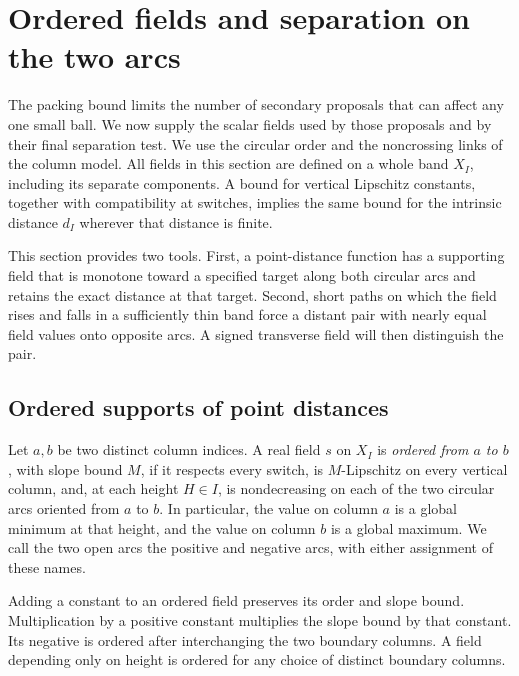 \section{Ordered fields and separation on the two arcs}
\label{ord:section}

The packing bound limits the number of secondary proposals that can
affect any one small ball. We now supply the scalar fields used by those
proposals and by
their final separation test. We use the circular order and the
noncrossing links of the column model.
All fields in this section are defined on a whole band $X_I$, including
its separate components. A bound for vertical Lipschitz constants,
together with compatibility at switches, implies the same bound for
the intrinsic distance $d_I$ wherever that distance is finite.

This section provides two tools.  First, a point-distance function has a
supporting field that is monotone toward a specified target along both
circular arcs and retains the exact distance at that target.  Second,
short paths on which the field rises and falls in a sufficiently thin band
force a distant pair with nearly equal field values onto opposite arcs.  A
signed transverse field will then distinguish the pair.

\subsection{Ordered supports of point distances}

\begin{definition}\label{ord:definition}
Let $a,b$ be two distinct column indices. A real field $s$ on $X_I$ is
\emph{ordered from $a$ to $b$}, with slope bound $M$, if it respects
every switch, is $M$-Lipschitz on every vertical column, and, at each
height $H\in I$, is nondecreasing on each of the two circular arcs
oriented from $a$ to $b$. In particular, the value on column $a$ is a
global minimum at that height, and the value on column $b$ is a global
maximum. We call the two open arcs the positive and negative arcs,
with either assignment of these names.
\end{definition}

Adding a constant to an ordered field preserves its order and slope
bound. Multiplication by a positive constant multiplies the slope
bound by that constant. Its negative is ordered after interchanging
the two boundary columns. A field depending only on height is
ordered for any choice of distinct boundary columns.

